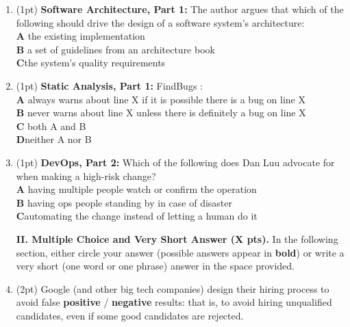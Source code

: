 \documentclass{report}
\newif\ifkey
\newcommand{\correct}[1]{\ifkey\color{red}\textbf{#1}\color{black}\else\textbf{#1}\fi\xspace}
\newcommand*{\pts}[1]{\addtocounter{points}{#1}(#1pt)}
\begin{document}
\begin{spacing}{1.4}
\begin{enumerate}[leftmargin=*]
\item \pts{1}
  \textbf{Software Architecture, Part 1:}
  The author argues that which of the following should drive the design of a software system’s architecture:
  \\ \textbf{A}\hspace{0.2in} the existing implementation
  \\ \textbf{B}\hspace{0.2in} a set of guidelines from an architecture book
  \\ \correct{C}\hspace{0.2in}the system’s quality requirements

\item \pts{1}
  \textbf{Static Analysis, Part 1:}
  FindBugs \underline{\hspace{1in}}:
  \\ \textbf{A}\hspace{0.2in} always warns about line X if it is possible there is a bug on line X
  \\ \textbf{B}\hspace{0.2in} never warns about line X unless there is definitely a bug on line X
  \\ \textbf{C}\hspace{0.2in} both A and B
  \\ \correct{D}\hspace{0.2in}neither A nor B

\item \pts{1}
  \textbf{DevOps, Part 2:}
  Which of the following does Dan Luu advocate for when making a high-risk change?
  \\ \textbf{A}\hspace{0.2in} having multiple people watch or confirm the operation
  \\ \textbf{B}\hspace{0.2in} having ops people standing by in case of disaster
  \\ \correct{C}\hspace{0.2in}automating the change instead of letting a human do it
 

  \newpage

  \textbf{II. Multiple Choice and Very Short Answer (X pts).} In the following section, either circle your
  answer (possible answers appear in \textbf{bold}) or write a very short (one word or one phrase) answer in the space provided.

\item \pts{2} Google (and other big tech companies) design their hiring process
  to avoid false \correct{positive} / \textbf{negative} results: that is, to avoid hiring unqualified candidates,
  even if some good candidates are rejected.


\end{enumerate}
\end{spacing}
\end{document}
